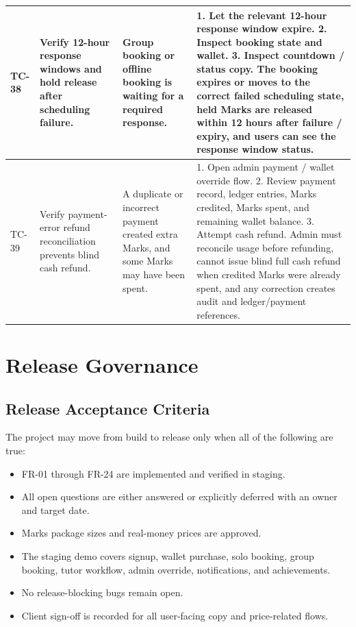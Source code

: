 \documentclass[11pt,a4paper]{article}
\begin{document}
\begin{longtable}{|L{1.2cm}|L{3.3cm}|L{3.9cm}|L{6.0cm}|}
	\hline
	TC-38          & Verify 12-hour response windows and hold release after scheduling failure.              & Group booking or offline booking is waiting for a required response.                                & 1. Let the relevant 12-hour response window expire. 2. Inspect booking state and wallet. 3. Inspect countdown / status copy. \newline The booking expires or moves to the correct failed scheduling state, held Marks are released within 12 hours after failure / expiry, and users can see the response window status.                                                      \\
	\hline
	TC-39          & Verify payment-error refund reconciliation prevents blind cash refund.              & A duplicate or incorrect payment created extra Marks, and some Marks may have been spent.                                & 1. Open admin payment / wallet override flow. 2. Review payment record, ledger entries, Marks credited, Marks spent, and remaining wallet balance. 3. Attempt cash refund. \newline Admin must reconcile usage before refunding, cannot issue blind full cash refund when credited Marks were already spent, and any correction creates audit and ledger/payment references.                                                      \\
	\hline
\end{longtable}
\normalsize

\section{Release Governance}

\subsection{Release Acceptance Criteria}

The project may move from build to release only when all of the following are true:

\begin{itemize}
    \item FR-01 through FR-24 are implemented and verified in staging.
    \item All open questions are either answered or explicitly deferred with an owner and target date.
    \item Marks package sizes and real-money prices are approved.
    \item The staging demo covers signup, wallet purchase, solo booking, group booking, tutor workflow, admin override, notifications, and achievements.
    \item No release-blocking bugs remain open.
    \item Client sign-off is recorded for all user-facing copy and price-related flows.
\end{itemize}
\end{document}
